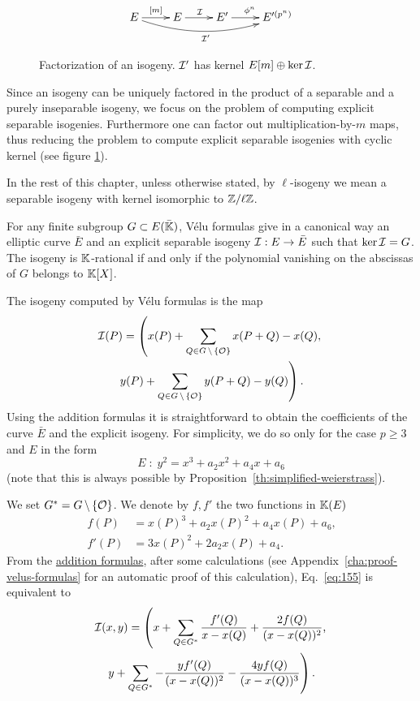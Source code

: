 \begin{figure}
  \centering
  \[\xymatrix{
    E \ar[r]^{[m]}\ar@/_1pc/[rrr]_{\I'} & E \ar[r]^\I & E' \ar[r]^{\frobisog^n} & E'^{(p^n)}
  }\]
  \label{fig:fact}
  \caption{Factorization of an isogeny. $\mathcal{I}'$ has kernel $E[m]\oplus\ker\mathcal{I}$.}
\end{figure}

Since an isogeny can be uniquely factored in the product of a
separable and a purely inseparable isogeny, we focus on the problem of
computing explicit separable isogenies. Furthermore one can factor out
multiplication-by-$m$ maps, thus reducing the problem to compute
explicit separable isogenies with cyclic kernel (see figure
\ref{fig:fact}).

In the rest of this chapter, unless otherwise stated, by
$\ell$-isogeny we mean a separable isogeny with kernel isomorphic to
$\mathbb{Z}/\ell\mathbb{Z}$.


For any finite subgroup $G \subset E(\bar{\mathbb{K}})$, Vélu formulas
\cite{velu71} give in a canonical way an elliptic curve $\bar{E}$ and
an explicit separable isogeny $\mathcal{I}:E\rightarrow \bar{E}$ such that
$\ker\mathcal{I}=G$. The isogeny is $\mathbb{K}$-rational if and only if the polynomial
vanishing on the abscissas of $G$ belongs to $\mathbb{K}[X]$.

The isogeny computed by Vélu formulas is the map
\begin{multline}
  \label{eq:155}
  \mathcal{I}(P) = \left(x(P) + \sum_{Q\in G\,\backslash\,\{\mathcal{O}\}}x(P+Q) - x(Q),\right.\\
    \left.y(P) + \sum_{Q\in G\,\backslash\,\{\mathcal{O}\}}y(P+Q) - y(Q)\right)
  \text{.}
\end{multline}
Using the addition formulas it is straightforward to obtain the
coefficients of the curve $\bar{E}$ and the explicit isogeny.  For
simplicity, we do so only for the case $p\ge3$ and $E$ in the form
\begin{equation}
  \label{eq:160}
  E \;:\; y^2 =  x^3 + a_2x^2 + a_4x + a_6
\end{equation}
(note that this is always possible by
Proposition~\ref{th:simplified-weierstrass}). 

We set $G^\ast=G\,\backslash\,\{\mathcal{O}\}$. We denote by $f,f'$ the two
functions in $\mathbb{K}(E)$
\begin{equation}
  \label{eq:162}
  \begin{aligned}
    f(P) &= x(P)^3 + a_2x(P)^2 + a_4x(P) + a_6
    \text{,}\\
    f'(P) &= 3x(P)^2 + 2a_2x(P) + a_4
    \text{.}
  \end{aligned}
\end{equation}
From the \hyperref[eq:121]{addition formulas}, after some calculations
(see Appendix~\ref{cha:proof-velus-formulas} for an automatic proof of
this calculation), Eq.~\eqref{eq:155} is equivalent to
\begin{multline}
  \label{eq:161}
  \mathcal{I}(x,y) = \left(x + \sum_{Q\in G^\ast} \frac{f'(Q)}{x-x(Q)} + \frac{2f(Q)}{(x-x(Q))^2}\text{,}\right.\\
  \left.y + \sum_{Q\in G^\ast} -\frac{yf'(Q)}{(x-x(Q))^2} - \frac{4yf(Q)}{(x-x(Q))^3}\right)
  \text{.}
\end{multline}

